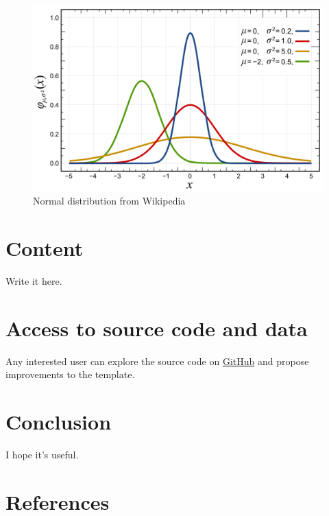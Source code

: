 \documentclass{latex/CUP-JNL-DAP}%
\begin{document}
\begin{figure}[H]

{\centering \includegraphics[width=7.5in,height=\textheight,keepaspectratio]{images/Normal_Distribution_PDF.png}

}

\caption{Normal distribution from Wikipedia}

\end{figure}%

\section{Content}\label{content}

Write it here.

\section{Access to source code and
data}\label{access-to-source-code-and-data}

Any interested user can explore the source code on
\href{https://github.com/pachadotdev/data-and-policy-quarto-template}{GitHub}
and propose improvements to the template.

\section{Conclusion}\label{conclusion}

I hope it's useful.

\section*{References}\label{references}
\end{document}
